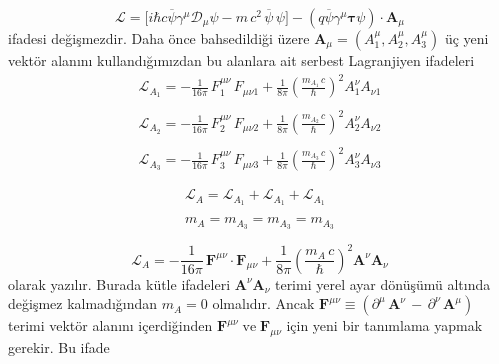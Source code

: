 \begin{equation} \label{ym16}
\mathcal{L} = \big[ i\hbar c\overline{\psi}\gamma^{\mu}\mathcal{D}_{\mu} \psi - m\,c^{2}\,\overline{\psi}\,\psi \big] - (q\overline{\psi}\gamma^{\mu}\boldsymbol{\tau}\psi)\cdot\mathbf{A}_{\mu}
\end{equation}
ifadesi değişmezdir. Daha önce bahsedildiği üzere $\mathbf{A}_{\mu} = (A^{\mu}_{1},A^{\mu}_{2},A^{\mu}_{3})$  üç yeni vektör alanını kullandığımızdan bu alanlara ait serbest Lagranjiyen ifadeleri
\begin{equation*}
	\begin{aligned}
\mathcal{L}_{A_{1}} = -\frac{1}{16\pi}\,F^{\mu\nu}_{1}\,F_{\mu\nu 1} + \frac{1}{8\pi}\left(\frac{m_{A_{1}}\,c}{\hbar}\right)^{2}A^{\nu}_{1}A_{\nu 1} \\
\\
\mathcal{L}_{A_{2}} = -\frac{1}{16\pi}\,F^{\mu\nu}_{2}\,F_{\mu\nu 2} + \frac{1}{8\pi}\left(\frac{m_{A_{2}}\,c}{\hbar}\right)^{2}A^{\nu}_{2}A_{\nu 2} \\
\\
\mathcal{L}_{A_{3}} = -\frac{1}{16\pi}\,F^{\mu\nu}_{3}\,F_{\mu\nu 3} + \frac{1}{8\pi}\left(\frac{m_{A_{3}}\,c}{\hbar}\right)^{2}A^{\nu}_{3}A_{\nu 3} \\
\\
	\end{aligned}
\end{equation*}
\begin{equation*}
	\begin{aligned}
\mathcal{L}_{A} = \mathcal{L}_{A_{1}} +\mathcal{L}_{A_{1}} + \mathcal{L}_{A_{1}} 	\\
\\
m_{A} = m_{A_{3}} = m_{A_{3}} = m_{A_{3}}\\
\\
	\end{aligned}
\end{equation*}
\begin{equation} \label{ym17}
\mathcal{L}_{A} = -\frac{1}{16\pi}\,\mathbf{F}^{\mu\nu}\cdot \mathbf{F}_{\mu\nu}  + \frac{1}{8\pi}\left(\frac{m_{A}\,c}{\hbar}\right)^{2} \mathbf{A}^{\nu} \mathbf{A}_{\nu}
\end{equation}	
olarak yazılır. Burada kütle ifadeleri $\mathbf{A}^{\nu} \mathbf{A}_{\nu}$ terimi yerel ayar dönüşümü altında değişmez kalmadığından $m_{A} = 0 $ olmalıdır. Ancak $\mathbf{F}^{\mu\nu} \equiv (\partial^{\mu}\,\mathbf{A}^{\nu}\,  - \, \partial^{\nu}\,\mathbf{A}^{\mu} )$ terimi vektör alanını içerdiğinden $\mathbf{F}^{\mu\nu}\;\textrm{ve}\;\mathbf{F}_{\mu\nu}$ için yeni bir tanımlama yapmak gerekir. Bu ifade
